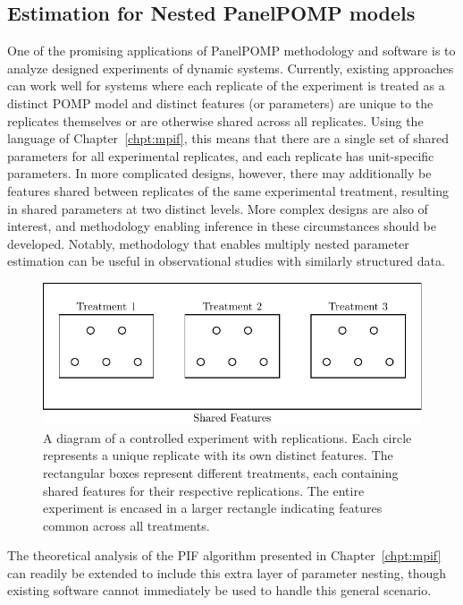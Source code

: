 \subsection*{Estimation for Nested PanelPOMP models}

One of the promising applications of PanelPOMP methodology and software is to analyze designed experiments of dynamic systems.
Currently, existing approaches can work well for systems where each replicate of the experiment is treated as a distinct POMP model and distinct features (or parameters) are unique to the replicates themselves or are otherwise shared across all replicates.
Using the language of Chapter~\ref{chpt:mpif}, this means that there are a single set of shared parameters for all experimental replicates, and each replicate has unit-specific parameters. 
In more complicated designs, however, there may additionally be features shared between replicates of the same experimental treatment, resulting in shared parameters at two distinct levels.
More complex designs are also of interest, and methodology enabling inference in these circumstances should be developed.
Notably, methodology that enables multiply nested parameter estimation can be useful in observational studies with similarly structured data. 

\begin{figure}[h!]
    \centering
    \includegraphics[width=0.7\linewidth]{chapters/conclusion/nestedDesign.pdf}
    \caption{A diagram of a controlled experiment with replications. Each circle represents a unique replicate with its own distinct features. The rectangular boxes represent different treatments, each containing shared features for their respective replications. The entire experiment is encased in a larger rectangle indicating features common across all treatments.}
    \label{fig:controlled_experiment}
\end{figure}

The theoretical analysis of the PIF algorithm presented in Chapter~\ref{chpt:mpif} can readily be extended to include this extra layer of parameter nesting, though existing software cannot immediately be used to handle this general scenario.

